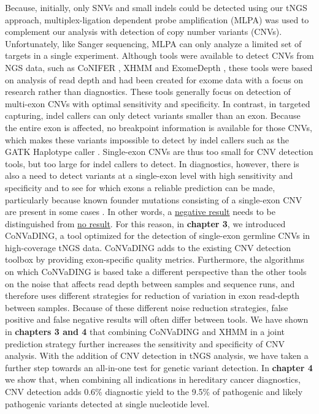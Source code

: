 Because, initially, only SNVs and small indels could be detected using our tNGS approach, multiplex-ligation dependent probe amplification (MLPA) was used to complement our analysis with detection of copy number variants (CNVs). 
Unfortunately, like Sanger sequencing, MLPA can only analyze a limited set of targets in a single experiment. 
Although tools were available to detect CNVs from NGS data, such as CoNIFER \cite{Krumm_2012}, XHMM \cite{Fromer_2012} and ExomeDepth \cite{Plagnol_2012}, these tools were based on analysis of read depth and had been created for exome data with a focus on research rather than diagnostics. 
These tools generally focus on detection of multi-exon CNVs with optimal sensitivity and specificity. 
In contrast, in targeted capturing, indel callers can only detect variants smaller than an exon. 
Because the entire exon is affected, no breakpoint information is available for those CNVs, which makes these variants impossible to detect by indel callers such as the GATK Haplotype caller \cite{van_der_Auwera_2013}.
Single-exon CNVs are thus too small for CNV detection tools, but too large for indel callers to detect.
In diagnostics, however, there is also a need to detect variants at a single-exon level with high sensitivity and specificity and to see for which exons a reliable prediction can be made, particularly because known founder mutations consisting of a single-exon CNV are present in some cases \cite{Bayley_2009,Petrij_Bosch_1997}. 
In other words, a \underline{negative result} needs to be distinguished from \underline{no result}. 
For this reason, in \textbf{chapter 3}, we introduced CoNVaDING, a tool optimized for the detection of single-exon germline CNVs in high-coverage tNGS data. 
CoNVaDING adds to the existing CNV detection toolbox by providing exon-specific quality metrics. 
Furthermore, the algorithms on which CoNVaDING is based take a different perspective than the other tools on the noise that affects read depth between samples and sequence runs, and therefore uses different strategies for
reduction of variation in exon read-depth between samples. 
Because of these different noise reduction strategies, false positive and false negative results will often differ between tools. 
We have shown in \textbf{chapters 3 and 4} that combining CoNVaDING and XHMM in a joint prediction strategy further increases the sensitivity and specificity of CNV analysis. 
With the addition of CNV detection in tNGS analysis, we have taken a further step towards an all-in-one test for genetic variant detection.
In \textbf{chapter 4} we show that, when combining all indications in hereditary cancer diagnostics, CNV detection adds 0.6\% diagnostic yield to the 9.5\% of pathogenic and likely pathogenic variants detected at single nucleotide level.

